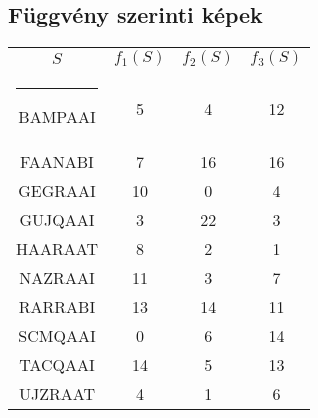 \documentclass{scrartcl}
\makeatletter
\def\hlinewd#1{%
\noalign{\ifnum0=`}\fi\hrule \@height #1 %
\futurelet\reserved@a\@xhline}
\makeatother
\begin{document}
\subsection{Függvény szerinti képek}
\sffamily
\begin{tabular}{c||c|c|c}
$S$ & $f_1(S)$ & $f_2(S)$ & $f_3(S)$ \\ 
\hlinewd{1pt}
BAMPAAI & 5  & 4  & 12\\
FAANABI & 7  & 16 & 16\\
GEGRAAI & 10 & 0  & 4\\
GUJQAAI & 3  & 22 & 3\\
HAARAAT & 8  & 2  & 1\\
NAZRAAI & 11 & 3  & 7\\
RARRABI & 13 & 14 & 11\\
SCMQAAI & 0  & 6  & 14\\
TACQAAI & 14 & 5  & 13\\
UJZRAAT & 4  & 1  & 6\\
\end{tabular} 
\normalfont
\end{document}
